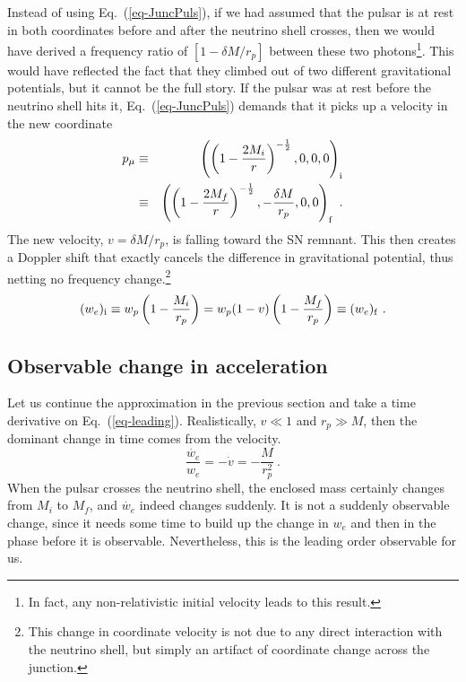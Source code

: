 \documentclass[aps,showpacs,onecolumn,floats,prd,superscriptaddress,nofootinbib]{revtex4}
\begin{document}
Instead of using Eq.~(\ref{eq-JuncPuls}), if we had assumed that the pulsar is at rest in both coordinates before and after the neutrino shell crosses, then we would have derived a frequency ratio of $[1-\delta M/r_p]$ between these two photons\footnote{In fact, any non-relativistic initial velocity leads to this result.}. This would have reflected the fact that they climbed out of two different gravitational potentials, but it cannot be the full story. If the pulsar was at rest before the neutrino shell hits it, Eq.~(\ref{eq-JuncPuls}) demands that it picks up a velocity in the new coordinate
 \begin{eqnarray}
p_\mu &\equiv& \left( \left( 1 - \frac{2M_i}{r} \right)^{-\frac{1}{2}}, 0, 0,0\right)_{\rm i} 
\label{eq-PulsarRest} \\ \nonumber  &\equiv&	
\left( \left( 1 - \frac{2M_f}{r} \right)^{-\frac{1}{2}}, -\frac{\delta M}{r_p},0,0 \right)_{\rm f}~.
\end{eqnarray}
The new velocity, $v=\delta M/r_p$, is falling toward the SN remnant. This then creates a Doppler shift that exactly cancels the difference in gravitational potential, thus netting no frequency change.\footnote{This change in coordinate velocity is not due to any direct interaction with the neutrino shell, but simply an artifact of coordinate change across the junction.}
\begin{equation}
(w_e)_{\rm i} \equiv w_p \left(1-\frac{M_i}{r_p}\right) = 
w_p (1-v)\left(1-\frac{M_f}{r_p}\right) \equiv (w_e)_{\rm f}~.
\label{eq-leading}
\end{equation}

\subsection{Observable change in acceleration}
\label{sec-acceleration}

Let us continue the approximation in the previous section and take a time derivative on Eq.~(\ref{eq-leading}). Realistically, $v \ll1$ and $r_p\gg M$, then the dominant change in time comes from the velocity.
\begin{equation}
\frac{\dot{w_e}}{w_e} = -\dot{v} = -\frac{M}{r_p^2}~.
\label{eq-AccChange}
\end{equation}
When the pulsar crosses the neutrino shell, the enclosed mass certainly changes from $M_i$ to $M_f$, and $\dot{w_e}$ indeed changes suddenly. It is not a suddenly observable change, since it needs some time to build up the change in $w_e$ and then in the phase before it is observable. Nevertheless, this is the leading order observable for us.
\end{document}
